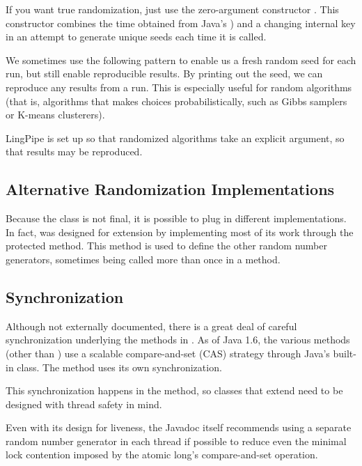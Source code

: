 If you want true randomization, just use the zero-argument constructor
.  This constructor combines the time obtained from
Java's ) and a changing internal key in an
attempt to generate unique seeds each time it is called.

We sometimes use the following pattern to enable us a fresh random
seed for each run, but still enable reproducible results.
%
%
By printing out the seed, we can reproduce any results from a run.
This is especially useful for random algorithms (that is, algorithms
that makes choices probabilistically, such as Gibbs samplers or
K-means clusterers).  

LingPipe is set up so that randomized algorithms take an explicit
 argument, so that results may be reproduced.


\subsection{Alternative Randomization Implementations}

Because the  class is not final, it is possible to plug
in different implementations.  In fact,  was designed for
extension by implementing most of its work through the protected
 method.  This method is used to define the other
random number generators, sometimes being called more than once in a
method.

\subsection{Synchronization}

Although not externally documented, there is a great deal of careful
synchronization underlying the methods in .  As of Java
1.6, the various  methods (other than
) use a scalable compare-and-set (CAS) strategy
through Java's built-in  class.  The
 method uses its own synchronization.

This synchronization happens in the  method, so
classes that extend  need to be designed with thread
safety in mind. 

Even with its design for liveness, the Javadoc itself recommends using
a separate random number generator in each thread if possible to
reduce even the minimal lock contention imposed by the atomic long's
compare-and-set operation.

